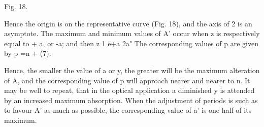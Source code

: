 Fig. 18.

Hence the origin is on the representative curve (Fig. 18), and the axis of 2 is
an asymptote. The maximum and minimum values of A' occur when z is respectively
equal to + a, or -a; and then z 1 e+a 2a" The corresponding values of p are
given by p =n + (7).

Hence, the smaller the value of a or y, the greater will be the maximum
alteration of A, and the corresponding value of p will approach nearer and
nearer to n. It may be well to repeat, that in the optical application a
diminished y is attended by an increased maximum absorption. When the
adjustment of periods is such as to favour A' as much as possible, the
corresponding value of a' is one half of its maximum.

